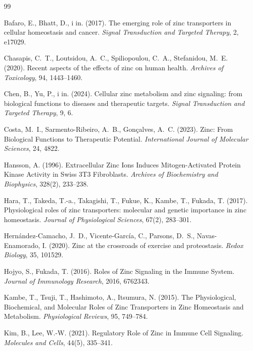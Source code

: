\documentclass[12pt,a4paper]{article}
\begin{document}
\newpage
\begin{thebibliography}{99}

Bafaro, E., Bhatt, D., i in. (2017). The emerging role of zinc transporters in cellular homeostasis and cancer. \textit{Signal Transduction and Targeted Therapy}, 2, e17029.

Chasapis, C.~T., Loutsidou, A.~C., Spiliopoulou, C.~A., Stefanidou, M.~E. (2020). Recent aspects of the effects of zinc on human health. \textit{Archives of Toxicology}, 94, 1443--1460.

Chen, B., Yu, P., i in. (2024). Cellular zinc metabolism and zinc signaling: from biological functions to diseases and therapeutic targets. \textit{Signal Transduction and Targeted Therapy}, 9, 6.

Costa, M.~I., Sarmento-Ribeiro, A.~B., Gonçalves, A.~C. (2023). Zinc: From Biological Functions to Therapeutic Potential. \textit{International Journal of Molecular Sciences}, 24, 4822.

Hansson, A. (1996). Extracellular Zinc Ions Induces Mitogen-Activated Protein Kinase Activity in Swiss 3T3 Fibroblasts. \textit{Archives of Biochemistry and Biophysics}, 328(2), 233--238.

Hara, T., Takeda, T.-a., Takagishi, T., Fukue, K., Kambe, T., Fukada, T. (2017). Physiological roles of zinc transporters: molecular and genetic importance in zinc homeostasis. \textit{Journal of Physiological Sciences}, 67(2), 283--301.

Hernández-Camacho, J.~D., Vicente-García, C., Parsons, D.~S., Navas-Enamorado, I. (2020). Zinc at the crossroads of exercise and proteostasis. \textit{Redox Biology}, 35, 101529.

Hojyo, S., Fukada, T. (2016). Roles of Zinc Signaling in the Immune System. \textit{Journal of Immunology Research}, 2016, 6762343.

Kambe, T., Tsuji, T., Hashimoto, A., Itsumura, N. (2015). The Physiological, Biochemical, and Molecular Roles of Zinc Transporters in Zinc Homeostasis and Metabolism. \textit{Physiological Reviews}, 95, 749--784.

Kim, B., Lee, W.-W. (2021). Regulatory Role of Zinc in Immune Cell Signaling. \textit{Molecules and Cells}, 44(5), 335--341.


\end{thebibliography}
\end{document}
